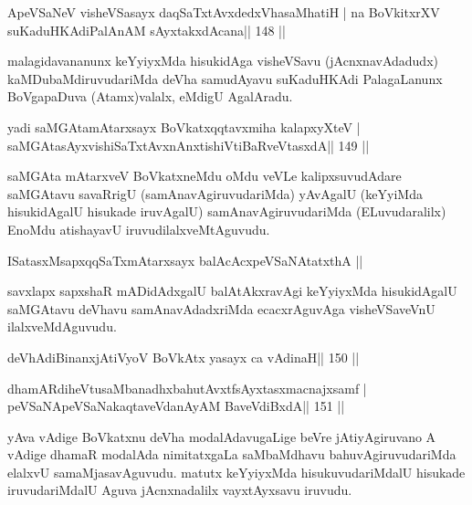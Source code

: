 
\begin{shl}
ApeVSaNeV visheVSasayx daqSaTxtAvxdedxVhasaMhatiH |
na BoVkitxrXV suKaduHKAdiPalAnAM sAyxtakxdAcana\hfill || 148 ||
\end{shl}

\begin{artha}
malagidavananunx keYyiyxMda hisukidAga visheVSavu (jAcnxnavAdadudx) kaMDubaMdiruvudariMda deVha samudAyavu suKaduHKAdi PalagaLanunx BoVgapaDuva (Atamx)valalx, eMdigU AgalAradu.
\end{artha}


\begin{shl}
yadi saMGAtamAtarxsayx BoVkatxqqtavxmiha kalapxyXteV |
saMGAtasAyxvishiSaTxtAvxnAnxtishiVtiBaRveVtasxdA\hfill || 149 ||
\end{shl}

\begin{artha}
saMGAta mAtarxveV BoVkatxneMdu oMdu veVLe kalipxsuvudAdare saMGAtavu 
savaRrigU (samAnavAgiruvudariMda) yAvAgalU (keYyiMda hisukidAgalU 
hisukade iruvAgalU) samAnavAgiruvudariMda (ELuvudaralilx) EnoMdu 
atishayavU iruvudilalxveMtAguvudu.
\end{artha}


\begin{shl}
ISatasxMsapxqqSaTxmAtarxsayx balAcAcx\s\s peVSaNAtatxthA ||
\end{shl}

\begin{artha}
savxlapx sapxshaR mADidAdxgalU balAtAkxravAgi keYyiyxMda hisukidAgalU saMGAtavu deVhavu samAnavAdadxriMda ecacxrAguvAga visheVSaveVnU ilalxveMdAguvudu.
\end{artha}

\begin{shl}
deVhAdiBinanxjAtiVyoV BoVkAtx yasayx ca vAdinaH\hfill || 150 ||
\end{shl}

\begin{shl}
dhamARdiheVtusaMbanadhxbahutAvxtfsAyxtasxmacnajxsamf |
peVSaNApeVSaNakaqtaveVdanAyAM BaveVdiBxdA\hfill || 151 ||
\end{shl}

\begin{artha}
yAva vAdige BoVkatxnu deVha modalAdavugaLige beVre jAtiyAgiruvano A  vAdige dhamaR modalAda nimitatxgaLa saMbaMdhavu bahuvAgiruvudariMda  elalxvU samaMjasavAguvudu. matutx keYyiyxMda hisukuvudariMdalU   hisukade iruvudariMdalU Aguva jAcnxnadalilx vayxtAyxsavu iruvudu.
\end{artha}

